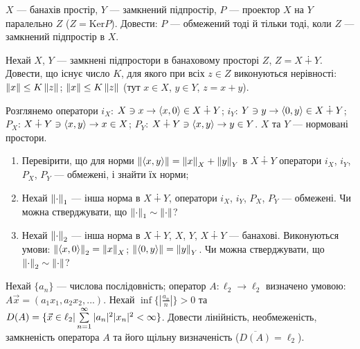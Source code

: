 
\begin{exercise}
    $X$ --- банахів простір, $Y$ --- замкнений підпростір, 
    $P$ --- проектор $X$ на $Y$ паралельно $Z$ ($Z = \mathrm{Ker} P$). 
    Довести: $P$ --- обмежений тоді й тільки тоді, коли $Z$ --- 
    замкнений підпростір в $X$.
\end{exercise}

\begin{exercise}
    Нехай $X$, $Y$ --- замкнені підпростори в банаховому просторі $Z$, 
    $Z = X \dotplus Y$. Довести, що існує число $K$, для якого при всіх $z \in Z$ 
    виконуються нерівності: $\left\lVert x\right\rVert \leq K\left\lVert z\right\rVert$; $\left\lVert x\right\rVert \leq K\left\lVert z\right\rVert$ (тут 
    $x \in X$, $y \in Y$, $z = x + y$). 
\end{exercise}

\begin{exercise}
    Розглянемо оператори $i_X$: $X \ni x \rightarrow 
    \left\langle x, 0\right\rangle \in X \dotplus Y$;
    $i_Y$: $Y \ni y \rightarrow 
    \left\langle0, y\right\rangle \in X \dotplus Y$;
    $P_X$: $X \dotplus Y \ni \left\langle x, y\right\rangle \rightarrow 
    x \in X $;
    $P_Y$: $X \dotplus Y \ni \left\langle x, y\right\rangle \rightarrow 
    y \in Y $. $X$ та $Y$ --- нормовані простори.
    \begin{enumerate}
        \item Перевірити, що для норми $\left\lVert\left\langle x, y\right\rangle\right\rVert = 
        \left\lVert x\right\rVert_X + \left\lVert y\right\rVert_Y$ в $X \dotplus Y$ оператори $i_X$, $i_Y$, 
        $P_X$, $P_Y$ --- обмежені, і знайти їх норми;
        \item Нехай $\left\lVert\cdot\right\rVert_1$ --- інша норма в $X \dotplus Y$, 
        оператори $i_X$, $i_Y$, $P_X$, $P_Y$ --- обмежені. Чи можна 
        стверджувати, що $\left\lVert\cdot\right\rVert_1 \sim \left\lVert\cdot\right\rVert$?
        \item Нехай $\left\lVert\cdot\right\rVert_2$ --- інша норма в $X \dotplus Y$,
        $X$, $Y$, $X \dotplus Y$ --- банахові. Виконуються умови: 
        $\left\lVert\left\langle x, 0\right\rangle\right\rVert_2 = \left\lVert x\right\rVert_X$; $\left\lVert\left\langle0, y\right\rangle\right\rVert 
        = \left\lVert y\right\rVert_Y$. Чи можна 
        стверджувати, що $\left\lVert\cdot\right\rVert_2 \sim \left\lVert\cdot\right\rVert$?
    \end{enumerate}
\end{exercise}

\begin{exercise}\label{N:2_1_18}
    Нехай $\{a_n\}$ --- числова послідовність; оператор $A: \ell_2 
    \rightarrow \ell_2$ визначено умовою: $A\vec{x} = 
    (a_1x_1, a_2x_2, ...)$. Нехай $\inf\{|\frac{a_n}{n}|\} > 0$ та 
    $D(A) = \{\vec{x} \in \ell_2 | \sum\limits_{n=1}^{\infty}|a_n|^2|x_n|^2 
    < \infty\}$. Довести лінійність, необмеженість, замкненість оператора 
    $A$ та його щільну визначеність ($\overline{D(A)} = \ell_2$).
\end{exercise}

